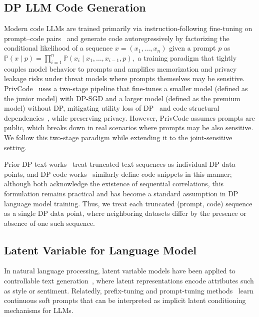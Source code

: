 \documentclass{article}
\theoremstyle{plain}
\theoremstyle{definition}
\theoremstyle{remark}
\begin{document}
\subsection{DP LLM Code Generation}
Modern code LLMs are trained primarily via instruction-following fine-tuning on prompt--code pairs~\cite{wei2021finetuned, ahmad2025opencodeinstruct} and generate code autoregressively by factorizing the conditional likelihood of a sequence $x=(x_1,\ldots,x_n)$ given a prompt $p$ as
$\mathbb{P}(x \mid p) = \prod_{i=1}^{n} \mathbb{P}(x_i \mid x_1, \ldots, x_{i-1}, p),$
a training paradigm that tightly couples model behavior to prompts and amplifies memorization and privacy leakage risks under threat models where prompts themselves may be sensitive. 
PrivCode~\cite{liu2025privcode} uses a two-stage pipeline that fine-tunes a smaller model (defined as the junior model) with DP-SGD and a larger model (defined as the premium model) without DP, mitigating utility loss of DP~\cite{DBLP:journals/corr/abs-2210-09929} and code structural dependencies~\cite{DBLP:journals/tosem/MaLZXWHZL24}, while preserving privacy.  However, PrivCode assumes prompts are public, which breaks down in real scenarios where prompts may be also sensitive. We follow this two-stage paradigm while extending it to the joint-sensitive setting.

Prior DP text works~\cite{sinha2025vaultgemma} treat truncated text sequences as individual DP data points, and DP code works~\cite{liu2025privcode} similarly define code snippets in this manner; although both acknowledge the existence of sequential correlations, this formulation remains practical and has become a standard assumption in DP language model training. Thus, we treat each truncated (prompt, code) sequence as a single DP data point, where neighboring datasets differ by the presence or absence of one such sequence.











\subsection{Latent Variable for Language Model}


In natural language processing, latent variable models have been applied to controllable text generation~\cite{bowman2016generating, hu2017controlled}, where latent representations encode attributes such as style or sentiment. Relatedly, prefix-tuning and prompt-tuning methods~\cite{li2021prefix, lester2021power} learn continuous soft prompts that can be interpreted as implicit latent conditioning mechanisms for LLMs. 
\end{document}

